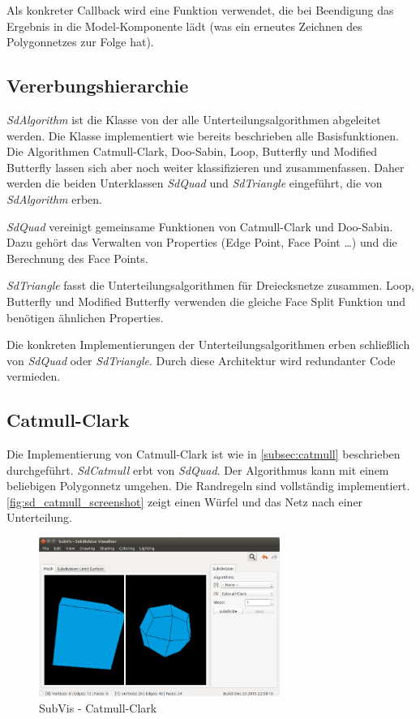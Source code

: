 Als konkreter Callback wird eine Funktion verwendet, die bei Beendigung das Ergebnis in die Model-Komponente lädt (was ein erneutes Zeichnen des Polygonnetzes zur Folge hat).

\subsection{Vererbungshierarchie}

\emph{SdAlgorithm} ist die Klasse von der alle Unterteilungsalgorithmen abgeleitet werden.
Die Klasse implementiert wie bereits beschrieben alle Basisfunktionen.
Die Algorithmen Catmull-Clark, Doo-Sabin, Loop, Butterfly und Modified Butterfly lassen sich aber
noch weiter klassifizieren und zusammenfassen.
Daher werden die beiden Unterklassen \emph{SdQuad} und \emph{SdTriangle} eingeführt,
die von \emph{SdAlgorithm} erben.

\emph{SdQuad} vereinigt gemeinsame Funktionen von Catmull-Clark und Doo-Sabin.
Dazu gehört das Verwalten von Properties (Edge Point, Face Point \ldots) und
die Berechnung des Face Points.

\emph{SdTriangle} fasst die Unterteilungsalgorithmen für Dreiecksnetze zusammen.
Loop, Butterfly und Modified Butterfly verwenden die gleiche Face Split Funktion
und benötigen ähnlichen Properties.

Die konkreten Implementierungen der Unterteilungsalgorithmen erben schließlich
von \emph{SdQuad} oder \emph{SdTriangle}.
Durch diese Architektur wird redundanter Code vermieden.


\subsection{Catmull-Clark}

Die Implementierung von Catmull-Clark ist wie in \autoref{subsec:catmull}
beschrieben durchgeführt. \emph{SdCatmull} erbt von \emph{SdQuad}.
Der Algorithmus kann mit einem beliebigen Polygonnetz umgehen.
Die Randregeln sind vollständig implementiert.
\autoref{fig:sd_catmull_screenshot} zeigt einen Würfel und das Netz nach
einer Unterteilung.

\begin{figure}
  \centering
  \includegraphics[width=0.7\textwidth]{content/media/sd_catmull_screenshot.png}
  \caption{SubVis - Catmull-Clark}
  \label{fig:sd_catmull_screenshot}
\end{figure}


